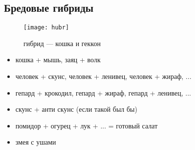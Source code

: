 \subsection{Бредовые гибриды}

\begin{figure}[ht!]
    \centering
    \texttt{[image: hubr]}
    \caption{гибрид --- кошка и геккон}
\end{figure}

\begin{itemize}
\item кошка + мышь, заяц + волк
\item человек + скунс, человек + ленивец, человек + жираф, ...
\item гепард + крокодил, гепард + жираф, гепард + ленивец, ...
\item скунс + анти скунс (если такой был бы)
\item помидор + огурец + лук + ... = готовый салат
\item змея с ушами

\end{itemize}
